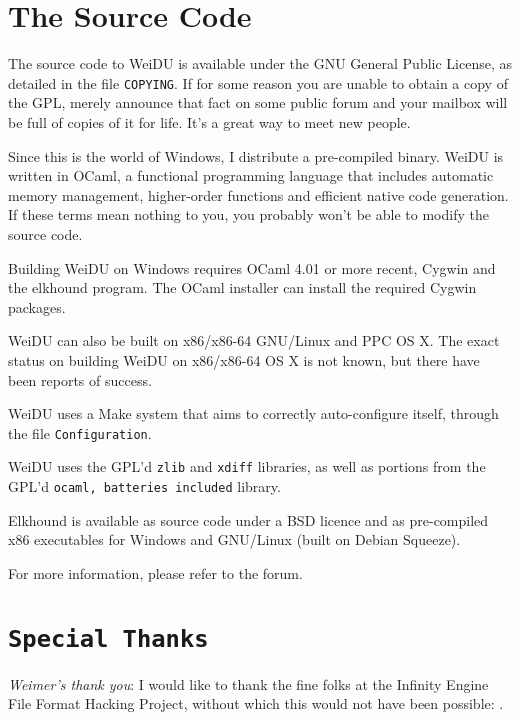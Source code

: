 \documentclass{article}
\def\DEFINE#1{{\tt \bf #1}\label{#1}\index{#1}}
\def\t#1{{\tt #1}}
\begin{document}
\section{The Source Code}

The source code to WeiDU is available under the GNU General Public License,
as detailed in the file \t{COPYING}. If for some reason you are unable to
obtain a copy of the GPL, merely announce that fact on some public forum
and your mailbox will be full of copies of it for life. It's a great way to
meet new people.

Since this is the world of Windows, I distribute a pre-compiled binary.
WeiDU is written in OCaml, a functional programming language that includes
automatic memory management, higher-order functions and efficient native
code generation. If these terms mean nothing to you, you probably won't be
able to modify the source code.

Building WeiDU on Windows requires OCaml 4.01 or more recent, Cygwin and the
elkhound program. The OCaml installer can install the required Cygwin
packages.

WeiDU can also be built on x86/x86-64 GNU/Linux and PPC OS X. The exact status
on building WeiDU on x86/x86-64 OS X is not known, but there have been reports
of success.

WeiDU uses a Make system that aims to correctly auto-configure itself, through
the file \t{Configuration}.

WeiDU uses the GPL'd \t{zlib} and \t{xdiff} libraries, as well as portions from
the GPL'd \t{ocaml, batteries included} library.

Elkhound is available as source code under a BSD licence and as
pre-compiled x86 executables for Windows and GNU/Linux (built on
Debian Squeeze).

For more information, please refer to the forum.

\section{\DEFINE{Special Thanks}}
{\em Weimer's thank you}:
I would like to thank the fine folks at the Infinity Engine File Format
Hacking Project, without which this would not have been possible:
.
\end{document}

